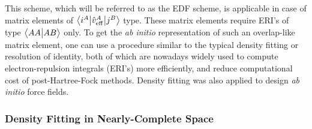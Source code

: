 \documentclass[aip,jcp,amsmath,amssymb,reprint,floatfix]{revtex4-1}
\begin{document}
This scheme, which will be referred to as the EDF scheme, 
is applicable in case of matrix elements of 
$
 \bigl\langle {i^A} \bigl\lvert {\hat{v}_{\rm eff}^A} \bigl\lvert {j^B} \bigr\rangle
$ type. 
 These matrix elements require ERI's of type
$\bigl\langle {AA} \bigl\lvert {AB} \bigr\rangle$ only.
To get the \emph{ab initio} representation of such an overlap\hyp{}like matrix element,
one can use a procedure similar to
the typical density fitting or resolution of identity, both of which are nowadays widely used 
to compute electron\hyp{}repulsion integrals (ERI's) more efficiently,
and reduce computational cost of post\hyp{}Hartree\hyp{}Fock methods. Density fitting was also
applied to design \emph{ab initio} force fields.\cite{Piquemal.Cisneros.Reinhardt.Gresh.Darden.JCP.2006,Cisneros.Andres.Piquemal.Darden.JCP.2005}

\subsubsection{\label{sss:2.3.1.GDF-1}Density Fitting in Nearly-Complete Space}
\end{document}
